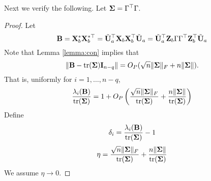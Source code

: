\documentclass[11pt]{article}
\DeclareMathOperator{\mytr}{tr}
\theoremstyle{plain}
\theoremstyle{definition}
\theoremstyle{remark}
\begin{document}
Next we verify the following.
Let $\boldsymbol{\Sigma}=\Gamma^\top \Gamma$.
\begin{proof}
    Let
    \begin{equation*}
    \mathbf{B}=\mathbf{X}_b^* \mathbf{X}_b^{*\top} 
    =
    \tilde{\mathbf{U}}_a^\top \mathbf{X}_b \mathbf{X}_b^{\top} \tilde{\mathbf{U}}_a 
    =
    \tilde{\mathbf{U}}_a^\top \mathbf{Z}_b\Gamma \Gamma^\top \mathbf{Z}_b^{\top} \tilde{\mathbf{U}}_a 
    \end{equation*}
    Note that Lemma \ref{lemma:con} implies that
    \begin{equation*}
        \|\BB-\mytr(\bSigma)\BI_{n-q} \|
        = 
        O_P(\sqrt{n} \|\bSigma\|_F + n \|\bSigma\|).
    \end{equation*}
    That is, uniformly for $i=1,\ldots,n-q$,
    \begin{equation*}
        \frac{ \lambda_i (\BB) } {\mytr (\bSigma)} = 1 + O_P \left( \frac{\sqrt n \|\bSigma\|_F}{\mytr(\bSigma)} + \frac{n \|\bSigma\|}{\mytr(\bSigma)}\right)
    \end{equation*}
    Define
    \begin{equation*}
        \delta_i= \frac{ \lambda_i (\BB) } {\mytr (\bSigma)}-1
    \end{equation*}
    \begin{equation*}
        \eta= \frac{\sqrt n \|\bSigma\|_F}{\mytr(\bSigma)} + \frac{n \|\bSigma\|}{\mytr(\bSigma)}
    \end{equation*}
    We assume $\eta \to 0$.


\end{proof}
\end{document}
